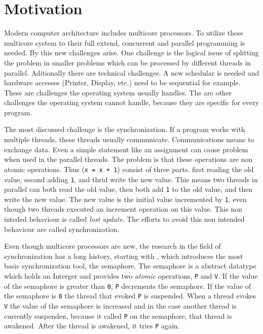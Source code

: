 
\chapter{Motivation} %

\label{Chapter0} %


\newcommand{\keyword}[1]{\textit{#1}}
\newcommand{\tabhead}[1]{\textbf{#1}}
\newcommand{\code}[1]{\texttt{#1}}
\newcommand{\file}[1]{\texttt{\bfseries#1}}
\newcommand{\option}[1]{\texttt{\itshape#1}}

Modern computer architecture includes multicore processors. To utilize these multicore system to their full extend, concurrent and parallel programming is needed.
By this new challenges arise. One challenge is the logical issue of splitting the problem in smaller problems which can be processed by different threads in parallel.
Aditionally there are technical challenges. A new schedular is needed and hardware accesses (Printer, Display, etc.) need to be sequential for example. These are challenges
the operating system usually handles. The are other challenges the operating system cannot handle, because they are specific for every program.

The most discussed challenge is the synchronization. If a program works with multiple threads, these threads usually communicate. Communications means to 
exchange data. Even a simple statement like an assignment can cause problem when used in the parallel threads. The problem is that these operations are
non atomic operations. Thus (\code{x = x + 1}) consist of three parts. first reading the old value, second adding \code{1}, and thrid write the new value.
This means two threads in parallel can both read the old value, then both add \code{1} to the old value, and then write the new value. 
The new value is the initial value incremented by \code{1}, even though two threads executed an increment operation on this value. 
This non inteded behaviour is called \keyword{lost update}. The efforts to avoid this non intended behaviour are called synchronization.

Even though multicore processors are new, the research in the field of synchronization has a long history, starting with \parencite{semaphore}, which 
introduces the most basic synchronization tool, the semaphore. The semaphore is a abstract datatype which holds an Interger and provides two 
\keyword{atomic} operations, \code{P} and \code{V}. If the value of the semaphore is greater than \code{0}, \code{P} decrements the semaphore. If the value of 
the semaphore is \code{0} the thread that evoked \code{P} is suspended. When a thread evokes \code{V} the value of the semaphore is increased and
in the case another thread is currently suspenden, because it called \code{P} on the semaphore, that thread is awakened. After the thread is
awakened, it tries \code{P} again. 

